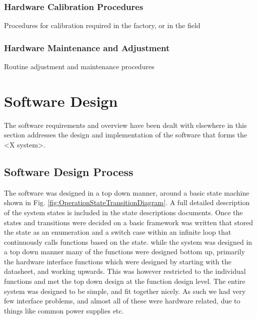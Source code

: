 \documentclass[]{report}
\begin{document}
\subsection{Hardware Calibration Procedures}
Procedures for calibration required in the factory, or in the field

\subsection{Hardware Maintenance and Adjustment}
Routine adjustment and maintenance procedures

\chapter{Software Design}
The software requirements and overview have been dealt with elsewhere in this section addresses the design and implementation of the software that forms the <X system>.

\section{Software Design Process}
The software was designed in a top down manner, around a basic state machine shown in Fig. \ref{fig:OperationStateTransitionDiagram}. A full detailed description of the system states is included in the state descriptions documents.
Once the states and transitions were decided on a basic framework was written that stored the state as an enumeration and a switch case within an infinite loop that continuously calls functions based on the state. \newline
while the system was designed in a top down manner many of the functions were designed bottom up, primarily the hardware interface functions which were designed by starting with the datasheet, and working upwards. This was however restricted to the individual functions and met the top down design at the function design level. \newline
The entire system was designed to be simple, and fit together nicely. As such we had very few interface problems, and almost all of these were hardware related, due to things like common power supplies etc.
\end{document}
